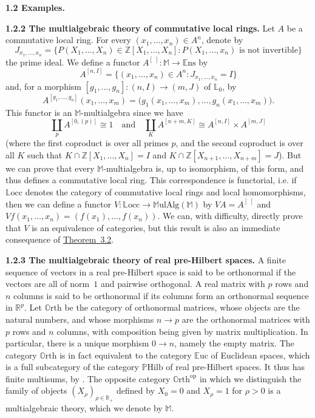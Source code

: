 \documentclass{article}
\newenvironment{rmenv}[1]
  {\phantomsection\par\medskip\noindent\textbf{#1.}\rmfamily}
  {\par\medskip}
\newcommand{\bb}[1]{{\mathbb{#1}}}
\newcommand{\op}{{\mathrm{op}}}
\newcommand{\Set}{\mathbb{E}\mathrm{ns}}
\newcommand{\MulAlg}{\mathbb{M}\mathrm{ulAlg}}
\newcommand{\Locc}{\mathbb{L}\mathrm{occ}}
\newcommand{\Orth}{\mathbb{O}\mathrm{rth}}
\newcommand{\Euc}{\mathbb{E}\mathrm{uc}}
\newcommand{\PHilb}{\mathbb{P}\mathrm{Hilb}}
\newcommand{\oldpage}[1]{\marginpar{\footnotesize$\Big\vert$ \textit{p.~#1}}}
\begin{document}
\begin{rmenv}{1.2 Examples}
\begin{rmenv}{1.2.2 The multialgebraic theory of commutative local rings}
    Let $A$ be a commutative local ring.
    For every $(x_1,\ldots,x_n)\in A^n$, denote by
    \[
      J_{x_1,\ldots,x_n} =
      \big\{
        P(X_1,\ldots,X_n)\in\bb{Z}[X_1,\ldots,X_n]
        :
        \mbox{$P(X_1,\ldots,x_n)$ is not invertible}
      \big\}
    \]
\oldpage{196}
    the prime ideal.
    We define a functor  $A^{[\,\,]}\colon\bb{M}\to\Set$ by
    \[
      A^{[n,I]}=\{(x_1,\ldots,x_n)\in A^n:J_{x_1,\ldots,x_n}=I\}
    \]
    and, for a morphism $[g_1,\ldots,g_n]\colon(n,I)\to(m,J)$ of $\bb{L}_0$, by
    \[
      A^{[g_1,\ldots,g_n]}(x_1,\ldots,x_m) =
      \big(
        g_1(x_1,\ldots,x_m),
        \ldots,
        g_n(x_1,\ldots,x_m)
      \big).
    \]
    This functor is an $\bb{M}$-multialgebra since we have
    \[
      \coprod_p A^{[0,(p)]} \cong 1
      \quad\text{and}\quad
      \coprod_K A^{[n+m,K]} \cong A^{[n,I]}\times A^{[m,J]}
    \]
    (where the first coproduct is over all primes $p$, and the second coproduct is over all $K$ such that $K\cap\bb{Z}[X_1,\ldots,X_n] = I$ and $K\cap\bb{Z}[X_{n+1},\ldots,X_{n+m}] = J$).
    But we can prove that every $\bb{M}$-multialgebra is, up to isomorphism, of this form, and thus defines a commutative local ring.
    This correspondence is functorial, i.e. if $\Locc$ denotes the category of commutative local rings and local homomorphisms, then we can define a functor $V\colon\Locc\to\MulAlg(\bb{M})$ by $VA=A^{[\,\,]}$ and $Vf(x_1,\ldots,x_n)=(f(x_1),\ldots,f(x_n))$.
    We can, with difficulty, directly prove that $V$ is an equivalence of categories, but this result is also an immediate consequence of \hyperref[3.2]{Theorem~3.2}.
  \end{rmenv}

  \begin{rmenv}{1.2.3 The multialgebraic theory of real pre-Hilbert spaces}
  \label{1.2.3}
    A finite sequence of vectors in a real pre-Hilbert space is said to be orthonormal if the vectors are all of norm~$1$ and pairwise orthogonal.
    A real matrix with $p$ rows and $n$ columns is said to be orthonormal if its columns form an orthonormal sequence in $\bb{R}^p$.
    Let $\Orth$ be the category of orthonormal matrices, whose objects are the natural numbers, and whose morphisms $n\to p$ are the orthonormal matrices with $p$ rows and $n$ columns, with composition being given by matrix multiplication.
    In particular, there is a unique morphism $0\to n$, namely the empty matrix.
    The category $\Orth$ is in fact equivalent to the category $\Euc$ of Euclidean spaces, which is a full subcategory of the category $\PHilb$ of real pre-Hilbert spaces.
    It thus has finite multisums, by \cite[{}1.1.3]{2}.
    The opposite category $\Orth^\op$ in which we distinguish the family of objects $(X_\rho)_{\rho\in\bb{R}_+}$ defined by $X_0=0$ and $X_\rho=1$ for $\rho>0$ is a multialgebraic theory, which we denote by $\bb{M}$.


\end{rmenv}
\end{rmenv}
\end{document}
